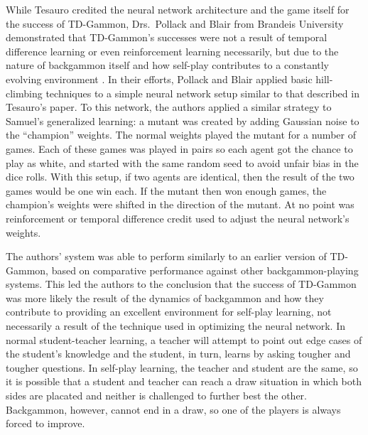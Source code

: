 While Tesauro credited the neural network architecture and the game itself for
the success of TD-Gammon,
Drs.\ Pollack and Blair from Brandeis University demonstrated that
TD-Gammon's successes were not a result of
temporal difference learning
or even reinforcement learning necessarily,
but due to the nature of backgammon itself and how self-play contributes to a
constantly evolving environment
\cite{why-td-gammon}.
%
In their efforts,
Pollack and Blair applied basic hill-climbing techniques to a simple neural
network setup similar to that described in Tesauro's paper.
%
To this network,
the authors applied a similar strategy to Samuel's generalized learning:
a mutant was created by adding Gaussian noise to the ``champion'' weights.
%
The normal weights played the mutant for a number of games.
%
Each of these games was played in pairs
so each agent got the chance to play as white,
and started with the same random seed to avoid unfair bias in the dice rolls.
%
With this setup,
if two agents are identical,
then the result of the two games would be one win each.
%
If the mutant then won enough games,
the champion's weights were shifted in the direction of the mutant.
%
At no point was reinforcement or temporal difference credit used to adjust the
neural network's weights.

The authors' system was able to perform similarly to an earlier version of TD-Gammon,
based on comparative performance against other backgammon-playing systems.
%
This led the authors to the conclusion that the success of TD-Gammon was
more likely
the result of the dynamics of backgammon and how they contribute to providing an
excellent environment for self-play learning,
not necessarily a result of the technique used in optimizing the neural network.
%
In normal student-teacher learning,
a teacher will attempt to point out edge cases of the student's knowledge
and the student, in turn, learns by asking tougher and tougher questions.
%
In self-play learning,
the teacher and student are the same,
so it is possible that a student and teacher can reach a draw situation in which
both sides are placated and neither is challenged to further best the other.
%
Backgammon, however,
cannot end in a draw,
so one of the players is always forced to improve.

